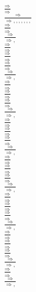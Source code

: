 \documentclass[11pt]{article}
\begin{document}
\begin{center}
\bigskip
\\$\frac{\Rightarrow }{\Rightarrow }$
\bigskip
\\$\frac{\Rightarrow }{\Rightarrow , , , , , , , }$
\bigskip
\\$\frac{\Rightarrow }{\Rightarrow }$
\bigskip
\\$\frac{\Rightarrow }{\Rightarrow , }$
\bigskip
\\$\frac{\Rightarrow }{\Rightarrow }$
\bigskip
\\$\frac{\Rightarrow }{\Rightarrow }$
\bigskip
\\$\frac{\Rightarrow }{\Rightarrow }$
\bigskip
\\$\frac{\Rightarrow }{\Rightarrow , }$
\bigskip
\\$\frac{\Rightarrow }{\Rightarrow }$
\bigskip
\\$\frac{\Rightarrow }{\Rightarrow }$
\bigskip
\\$\frac{\Rightarrow }{\Rightarrow }$
\bigskip
\\$\frac{\Rightarrow }{\Rightarrow , }$
\bigskip
\\$\frac{\Rightarrow }{\Rightarrow }$
\bigskip
\\$\frac{\Rightarrow }{\Rightarrow }$
\bigskip
\\$\frac{\Rightarrow }{\Rightarrow }$
\bigskip
\\$\frac{\Rightarrow }{\Rightarrow , }$
\bigskip
\\$\frac{\Rightarrow }{\Rightarrow }$
\bigskip
\\$\frac{\Rightarrow }{\Rightarrow }$
\bigskip
\\$\frac{\Rightarrow }{\Rightarrow }$
\bigskip
\\$\frac{\Rightarrow }{\Rightarrow , }$
\bigskip
\\$\frac{\Rightarrow }{\Rightarrow }$
\bigskip
\\$\frac{\Rightarrow }{\Rightarrow }$
\bigskip
\\$\frac{\Rightarrow }{\Rightarrow }$
\bigskip
\\$\frac{\Rightarrow }{\Rightarrow , }$
\bigskip
\\$\frac{\Rightarrow }{\Rightarrow }$
\bigskip
\\$\frac{\Rightarrow }{\Rightarrow }$
\bigskip
\\$\frac{\Rightarrow }{\Rightarrow }$
\bigskip
\\$\frac{\Rightarrow }{\Rightarrow , }$
\bigskip
\\$\frac{\Rightarrow }{\Rightarrow }$
\bigskip
\\$\frac{\Rightarrow }{\Rightarrow , }$

\end{center}
\end{document}
